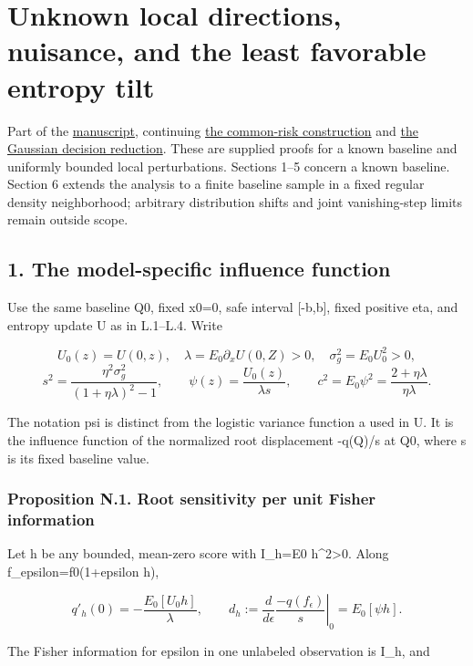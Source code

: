 \section{Unknown local directions, nuisance, and the least favorable
entropy
tilt}\label{unknown-local-directions-nuisance-and-the-least-favorable-entropy-tilt}

Part of the \href{DRAFT.md}{manuscript}, continuing
\href{local_prediction.md}{the common-risk construction} and
\href{gaussian_decision.md}{the Gaussian decision reduction}. These are
supplied proofs for a known baseline and uniformly bounded local
perturbations. Sections 1--5 concern a known baseline. Section 6 extends
the analysis to a finite baseline sample in a fixed regular density
neighborhood; arbitrary distribution shifts and joint vanishing-step
limits remain outside scope.

\subsection{1. The model-specific influence
function}\label{the-model-specific-influence-function}

Use the same baseline Q0, fixed x0=0, safe interval {[}-b,b{]}, fixed
positive eta, and entropy update U as in L.1--L.4. Write

\[
U_0(z)=U(0,z),\quad \lambda=E_0\partial_xU(0,Z)>0,
\quad \sigma_g^2=E_0U_0^2>0,
\] \[
s^2=\frac{\eta^2\sigma_g^2}{(1+\eta\lambda)^2-1},
\qquad \psi(z)=\frac{U_0(z)}{\lambda s},
\qquad c^2=E_0\psi^2=\frac{2+\eta\lambda}{\eta\lambda}.
\tag{N.1}
\]

The notation psi is distinct from the logistic variance function a used
in U. It is the influence function of the normalized root displacement
-q(Q)/s at Q0, where s is its fixed baseline value.

\subsubsection{Proposition N.1. Root sensitivity per unit Fisher
information}\label{proposition-n.1.-root-sensitivity-per-unit-fisher-information}

Let h be any bounded, mean-zero score with I\_h=E0 h\^{}2\textgreater0.
Along f\_epsilon=f0(1+epsilon h),

\[
q'_h(0)=-\frac{E_0[U_0h]}{\lambda},
\qquad d_h:=\left.\frac{d}{d\epsilon}\frac{-q(f_\epsilon)}s\right|_0
=E_0[\psi h].
\tag{N.2}
\]

The Fisher information for epsilon in one unlabeled observation is I\_h,
and

